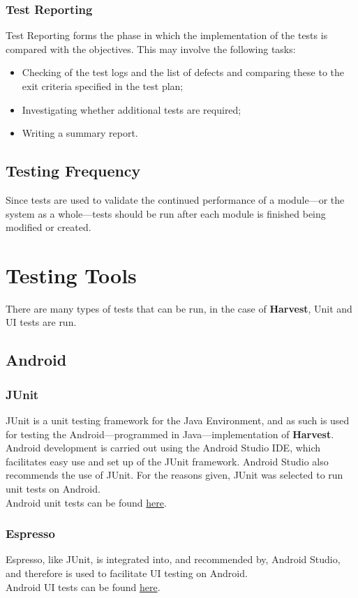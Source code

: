 \documentclass[12pt]{article}
\begin{document}
\subsubsection{Test Reporting}
Test Reporting forms the phase in which the implementation of the tests is compared with the objectives. This may involve the following tasks:
\begin{itemize}
 \item Checking of the test logs and the list of defects and comparing these to the exit criteria specified in the test plan;
\item Investigating whether additional tests are required;
\item Writing a summary report.
\end{itemize}
\subsection{Testing Frequency}
Since tests are used to validate the continued performance of a module---or the system as a whole---tests should be run after each module is finished being modified or created.

  \section{Testing Tools}
  There are many types of tests that can be run, in the case of \textbf{Harvest}, Unit and UI tests are run.
  \subsection{Android}
  \subsubsection{JUnit}
JUnit is a unit testing framework for the Java Environment, and as such is used for testing the Android---programmed in Java---implementation of \textbf{Harvest}. Android development is carried out using the Android Studio IDE, which facilitates easy use and set up of the JUnit framework. Android Studio also recommends the use of JUnit. For the reasons given, JUnit was selected to run unit tests on Android.\\
\indent Android unit tests can be found \href{https://github.com/BinaryNinjaz/COS301-Capstone/tree/master/Source/Android/Harvest/app/src/test/java/za/org/samac/harvest}{here}.

 \subsubsection{Espresso}
 Espresso, like JUnit, is integrated into, and recommended by, Android Studio, and therefore is used to facilitate UI testing on Android.\\
 \indent Android UI tests can be found \href{https://github.com/BinaryNinjaz/COS301-Capstone/tree/master/Source/Android/Harvest/app/src/androidTest/java/za/org/samac/harvest}{here}.
  
\end{document}
